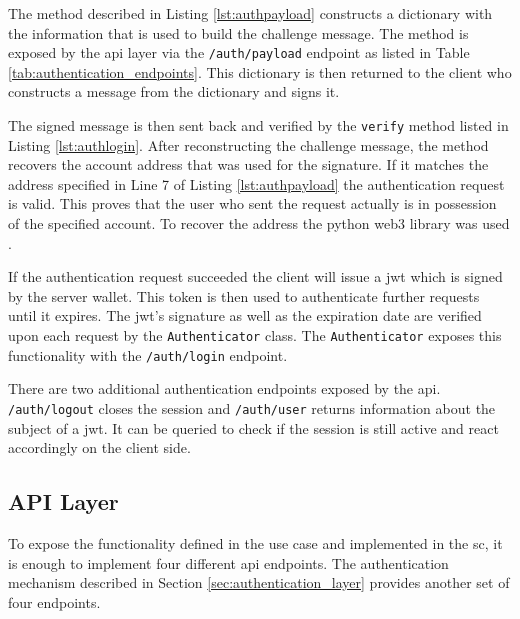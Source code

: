 

The method described in Listing \ref{lst:authpayload} constructs a dictionary with the information that is used to build the challenge message. The method is exposed by the \gls{api} layer via the \texttt{/auth/payload} endpoint as listed in Table \ref{tab:authentication_endpoints}. This dictionary is then returned to the client who constructs a message from the dictionary and signs it.



The signed message is then sent back and verified by the \texttt{verify} method listed in Listing \ref{lst:authlogin}. After reconstructing the challenge message, the method recovers the account address that was used for the signature. If it matches the address specified in Line 7 of Listing \ref{lst:authpayload} the authentication request is valid. This proves that the user who sent the request actually is in possession of the specified account. To recover the address the python web3 library was used \cite{web3python}.

If the authentication request succeeded the client will issue a \gls{jwt} which is signed by the server wallet. This token is then used to authenticate further requests until it expires. The \gls{jwt}'s signature as well as the expiration date are verified upon each request by the \texttt{Authenticator} class. The \texttt{Authenticator} exposes this functionality with the \texttt{/auth/login} endpoint.

There are two additional authentication endpoints exposed by the \gls{api}. \texttt{/auth/logout} closes the session and \texttt{/auth/user} returns information about the subject of a \gls{jwt}. It can be queried to check if the session is still active and react accordingly on the client side.

\subsection{API Layer}
To expose the functionality defined in the use case and implemented in the \gls{sc}, it is enough to implement four different \gls{api} endpoints. The authentication mechanism described in Section \ref{sec:authentication_layer} provides another set of four endpoints.

